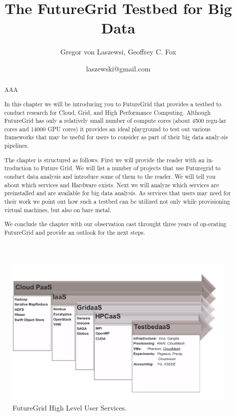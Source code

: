 \documentclass{article}
\begin{document}
\title{The FutureGrid Testbed for Big Data}
\author{Gregor von Laszewsi, Geoffrey C. Fox}
\date{laszewski@gmail.com}

\maketitle

\begin{abstract}

AAA

In this chapter we will be introducing you to FutureGrid that provides a testbed to conduct research for Cloud, Grid, and High Performance Computing. Although FutureGrid has only a relatively small number of compute cores (about 4500 regu-lar cores and 14000 GPU cores) it provides an ideal playground to test out various frameworks that may be useful for users to consider as part of their big data analy-sis pipelines. 

The chapter is structured as follows. First we will provide the reader with an in-troduction to Future Grid. We will list a number of projects that use Futuregrid to conduct data analysis and introduce some of them to the reader. We will tell you about which services and Hardware exists. Next we will analyze which services are preinstalled and are available for big data analysis. As services that users may need for their work we point out how such a testbed can be utilized not only while provisioning virtual machines, but also on bare metal. 

We conclude the chapter with our observation cast throught three years of op-erating FutureGrid and provide an outlook for the next steps.
\end{abstract}


\begin{figure}[h!]
  \caption{FutureGrid High Level User Services.}
  \centering
    \includegraphics[width=1.0\textwidth]{images/user-services}
\end{figure}
\end{document}
